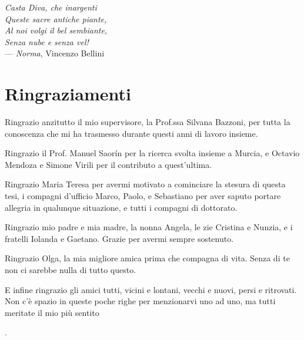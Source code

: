 
\begin{flushright}{\slshape
Casta Diva, che inargenti\\
Queste sacre antiche piante,\\
Al noi volgi il bel sembiante,\\
Senza nube e senza vel!} \\ \medskip
    --- \textit{Norma}, Vincenzo Bellini
\end{flushright}



\bigskip

\begingroup
\let\clearpage\relax
\let\cleardoublepage\relax
\let\cleardoublepage\relax
\chapter*{Ringraziamenti}
Ringrazio anzitutto il mio supervisore, la Prof.ssa Silvana Bazzoni, per tutta la conoscenza che mi ha trasmesso durante questi anni di lavoro insieme.

Ringrazio il Prof. Manuel Saor\'in per la ricerca svolta insieme a Murcia, e Octavio Mendoza e Simone Virili per il contributo a quest'ultima.

Ringrazio Maria Teresa per avermi motivato a cominciare la stesura di questa tesi, i compagni d'ufficio Marco, Paolo, e Sebastiano per aver saputo portare allegria in qualunque situazione, e tutti i compagni di dottorato.

Ringrazio mio padre e mia madre, la nonna Angela, le zie Cristina e Nunzia, e i fratelli Iolanda e Gaetano. Grazie per avermi sempre sostenuto.

Ringrazio Olga, la mia migliore amica prima che compagna di vita. Senza di te non ci sarebbe nulla di tutto questo.

E infine ringrazio gli amici tutti, vicini e lontani, vecchi e nuovi, persi e ritrovati. Non c'\`e spazio in queste poche righe per menzionarvi uno ad uno, ma tutti meritate il mio pi\`u sentito

\begin{flushright}
  . \hphantom{grazie}
\end{flushright}

\endgroup




